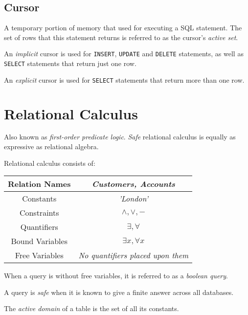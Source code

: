 \documentclass{article}
\begin{document}
\subsection{Cursor}

A temporary portion of memory that used for executing a SQL statement. The set of rows that this statement returns is referred to as the cursor's \textit{active set}.

An \textit{implicit} cursor is used for \texttt{INSERT}, \texttt{UPDATE} and \texttt{DELETE} statements, as well as \texttt{SELECT} statements that return just one row.

An \textit{explicit} cursor is used for \texttt{SELECT} statements that return more than one row.

\section{Relational Calculus}

Also known as \textit{first-order predicate logic}. \textit{Safe} relational calculus is equally as expressive as relational algebra.

Relational calculus consists of:

\begin{center}
  \begin{tabular}{|c|c|}
    \hline
    Relation Names  & \textit{Customers, Accounts}             \\
    \hline
    Constants       & \textit{'London'}                        \\
    \hline
    Constraints     & $\wedge, \vee, -$                        \\
    \hline
    Quantifiers     & $\exists, \forall$                       \\
    \hline
    Bound Variables & $\exists x, \forall x$                   \\
    \hline
    Free Variables  & \textit{No quantifiers placed upon them} \\
    \hline
  \end{tabular}
\end{center}

When a query is without free variables, it is referred to as a \textit{boolean query}.

A query is \textit{safe} when it is known to give a finite answer across all databases.

The \textit{active domain} of a table is the set of all its constants.
\end{document}

